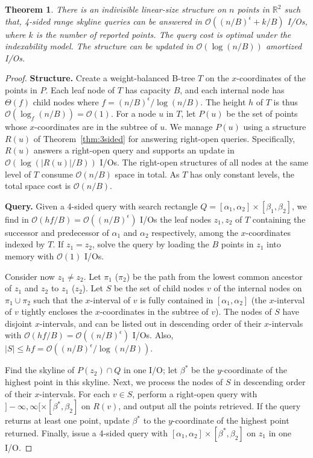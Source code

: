 \documentclass{sig-alternate}
\newtheorem{theorem}{Theorem}
\def\eps{\epsilon}
\def\real{\mathbb{R}}
\def\extraspacing{\vspace{2mm} \noindent}
\def\eps{\epsilon}
\newcommand{\bigO}{\mathcal{O}}
\renewcommand{\(}{\left(}
\renewcommand{\)}{\right)}
\begin{document}
\begin{theorem} \label{thm:4sided-main}
  There is an indivisible linear-size structure on $n$ points in $\real^2$ such
  that, 4-sided range skyline queries can be answered in $\bigO((n/B)^\eps +
  k/B)$ I/Os, where $k$ is the number of reported points. The query cost is
  optimal under the indexability model. The structure can be updated in
  $\bigO(\log (n/B))$ amortized I/Os.
\end{theorem}
\begin{fullenv}
\begin{proof}
\extraspacing \textbf{Structure.} Create a weight-balanced B-tree
\cite{AV03} $T$ on the $x$-coordinates of the points in $P$. Each leaf node of
$T$ has capacity $B$, and each internal node has $\Theta(f)$ child nodes where
$f = (n/B)^\eps / \log (n/B)$. The height $h$ of $T$ is thus $\bigO(\log_f
(n/B)) = \bigO(1)$.  For a node $u$ in $T$, let $P(u)$ be the set of points
whose $x$-coordinates are in the subtree of $u$.  We manage $P(u)$ using a
structure $R(u)$ of Theorem~\ref{thm:3sided} for answering right-open queries.
Specifically, $R(u)$ answers a right-open query and supports an update in
$\bigO(\log(|R(u)|/B))$ I/Os. The right-open structures of all nodes at the
same level of $T$ consume $\bigO(n/B)$ space in total. As $T$ has only constant
levels, the total space cost is $\bigO(n/B)$.

\extraspacing \textbf{Query.} Given a 4-sided query with search
rectangle $Q = [\alpha_1, \alpha_2] \times [\beta_1, \beta_2]$, we find in
$\bigO(h f/B) = \bigO((n/B)^\eps)$ I/Os the leaf nodes $z_1, z_2$ of $T$
containing the successor and predecessor of $\alpha_1$ and $\alpha_2$
respectively, among the $x$-coordinates indexed by $T$. If $z_1 = z_2$, solve
the query by loading the $B$ points in $z_1$ into memory with $\bigO(1)$ I/Os.

Consider now $z_1 \neq z_2$. Let $\pi_1$ ($\pi_2$) be the path from the lowest
common ancestor of $z_1$ and $z_2$ to $z_1$ ($z_2$). Let $S$ be the set of
child nodes $v$ of the internal nodes on $\pi_1 \cup \pi_2$ such that the
$x$-interval of $v$ is fully contained in $[\alpha_1, \alpha_2]$ (the
$x$-interval of $v$ tightly encloses the $x$-coordinates in the subtree of
$v$). The nodes of $S$ have disjoint $x$-intervals, and can be listed out in
descending order of their $x$-intervals with $\bigO(hf/B) = \bigO((n/B)^\eps)$
I/Os. Also, $|S| \le hf = \bigO((n/B)^\eps / \log (n/B))$.

Find the skyline of $P(z_2) \cap Q$ in one I/O; let $\beta^*$ be the
$y$-coordinate of the highest point in this skyline. Next, we process the nodes
of $S$ in descending order of their $x$-intervals. For each $v \in S$, perform
a right-open query with $]-\infty, \infty[ \times [\beta^*, \beta_2]$ on
$R(v)$, and output all the points retrieved. If the query returns at least one
point, update $\beta^*$ to the $y$-coordinate of the highest point returned.
Finally, issue a 4-sided query with $[\alpha_1, \alpha_2] \times [\beta^*,
\beta_2]$ on $z_1$ in one I/O.


\end{proof}
\end{fullenv}
\end{document}
